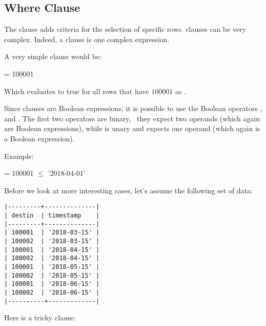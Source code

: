 \subsection{Where Clause}\label{subsec_where}
The  clause adds criteria for the selection
of specific rows.  clauses can be very complex.
Indeed, a  clause is one complex  expression.

A very simple  clause would be:

  = 100001

Which evaluates to true for all rows that have $100001$
as .

Since  clauses are Boolean expressions,
it is possible to use the Boolean operators
,  and .
The first two operators are binary, \ie\
they expect two operands (which again are
Boolean expressions), while 
is unary and expects one operand (which again
is a Boolean expression).

Example:

  = 100001
  $\le$ '2018-04-01'

Before we look at more interesting cases,
let's assume the following set of data:

\begin{minipage}{\textwidth}
\begin{verbatim}
|---------+--------------|
| destin  | timestamp    |
|---------+--------------|
| 100001  | '2018-03-15' |
| 100002  | '2018-03-15' |
| 100001  | '2018-04-15' |
| 100002  | '2018-04-15' |
| 100001  | '2018-05-15' |
| 100002  | '2018-05-15' |
| 100001  | '2018-06-15' |
| 100002  | '2018-06-15' |
|----------+-------------|
\end{verbatim}
\end{minipage}

Here is a tricky  clause:

